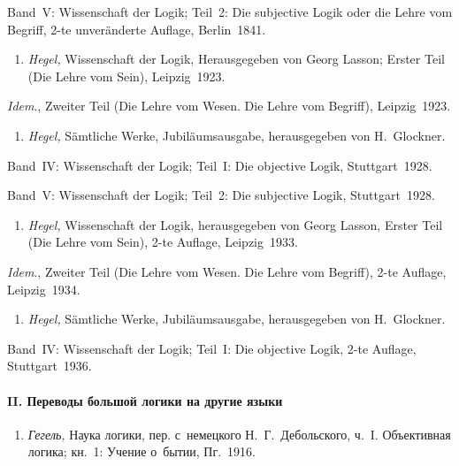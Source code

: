 Band~V: Wissen\-schaft der Logik; Teil~2: Die subjective Logik oder die Lehre
vom Begriff, 2-te unver\-änderte Auflage, Berlin~1841.

\begin{enumerate}
\item
{\em Hegel,} Wissen\-schaft der Logik, Heraus\-gegeben von Georg Lasson;
Erster Teil (Die Lehre vom Sein), Leipzig~1923.
\end{enumerate}

{\em Idem}., Zweiter Teil (Die Lehre vom Wesen. Die Lehre vom Begriff),
Leipzig~1923.

\begin{enumerate}
\item
{\em Hegel,} Sämtliche Werke, Jubiläums\-ausgabe, heraus\-gegeben von
H.~Glockner.
\end{enumerate}

Band~IV: Wissen\-schaft der Logik; Teil~I: Die objective Logik,
Stuttgart~1928.

Band~V: Wissen\-schaft der Logik; Teil~2: Die subjective Logik,
Stuttgart~1928.

\begin{enumerate}
\item
{\em Hegel,} Wissen\-schaft der Logik, heraus\-gegeben von Georg Lasson,
Erster Teil (Die Lehre vom Sein), 2-te Auflage, Leipzig~1933.
\end{enumerate}

{\em Idem}., Zweiter Teil (Die Lehre vom Wesen. Die Lehre vom Begriff),
2-te Auflage, Leipzig~1934.

\begin{enumerate}
\item
{\em Hegel,} Sämtliche Werke, Jubiläums\-ausgabe, heraus\-gegeben von
H.~Glockner.
\end{enumerate}

Band~IV: Wissen\-schaft der Logik; Teil~I: Die objective Logik, 2-te Auflage,
Stuttgart~1936.

\paragraph%
[II. Переводы большой логики на другие языки]%
{II. Переводы большой логики на другие языки}

\begin{enumerate}
\item
{\em Гегель,} Наука логики, пер. с~немецкого Н.~Г.~Дебольского, ч.~I.
Объективная логика; кн.~1: Учение о~бытии, Пг.~1916.
\end{enumerate}

